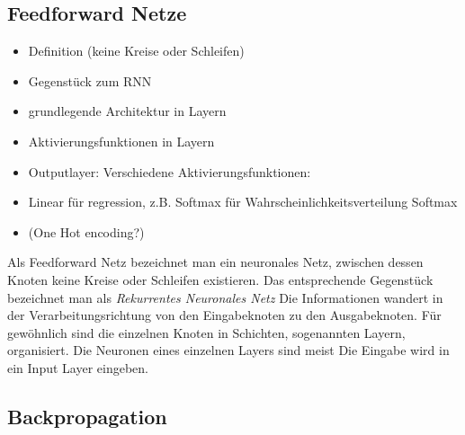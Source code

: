 


\subsection{Feedforward Netze}

\begin{itemize}
	\item Definition (keine Kreise oder Schleifen)
	\item Gegenstück zum RNN
	\item grundlegende Architektur in Layern 
	\item Aktivierungsfunktionen in Layern
	\item Outputlayer: Verschiedene Aktivierungsfunktionen:
	\item Linear für regression, z.B. Softmax für Wahrscheinlichkeitsverteilung Softmax
	\item (One Hot encoding?)
\end{itemize}



Als Feedforward Netz bezeichnet man ein neuronales Netz, zwischen dessen Knoten keine Kreise oder Schleifen existieren.
Das entsprechende Gegenstück bezeichnet man als \textit{Rekurrentes Neuronales Netz}
Die Informationen wandert in der Verarbeitungsrichtung von den Eingabeknoten zu den Ausgabeknoten.
Für gewöhnlich sind die einzelnen Knoten in Schichten, sogenannten Layern, organisiert.
Die Neuronen eines einzelnen Layers sind meist 
Die Eingabe wird in ein Input Layer eingeben.

\subsection{Backpropagation}


